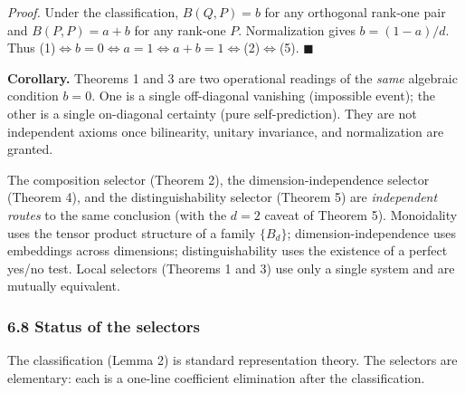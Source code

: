 \documentclass[
]{article}
\begin{document}
\emph{Proof.} Under the classification, \(B(Q,P)=b\) for any orthogonal
rank-one pair and \(B(P,P)=a+b\) for any rank-one \(P\). Normalization
gives \(b=(1-a)/d\). Thus
(1)\(\Leftrightarrow b=0\Leftrightarrow a=1\Leftrightarrow a+b=1\Leftrightarrow\)(2)\(\Leftrightarrow\)(5).
\(\blacksquare\)

\textbf{Corollary.} Theorems 1 and 3 are two operational readings of the
\emph{same} algebraic condition \(b=0\). One is a single off-diagonal
vanishing (impossible event); the other is a single on-diagonal
certainty (pure self-prediction). They are not independent axioms once
bilinearity, unitary invariance, and normalization are granted.

The composition selector (Theorem 2), the dimension-independence
selector (Theorem 4), and the distinguishability selector (Theorem 5)
are \emph{independent routes} to the same conclusion (with the \(d=2\)
caveat of Theorem 5). Monoidality uses the tensor product structure of a
family \(\{B_d\}\); dimension-independence uses embeddings across
dimensions; distinguishability uses the existence of a perfect yes/no
test. Local selectors (Theorems 1 and 3) use only a single system and
are mutually equivalent.

\subsubsection{6.8 Status of the
selectors}\label{status-of-the-selectors}

The classification (Lemma 2) is standard representation theory. The
selectors are elementary: each is a one-line coefficient elimination
after the classification.
\end{document}
